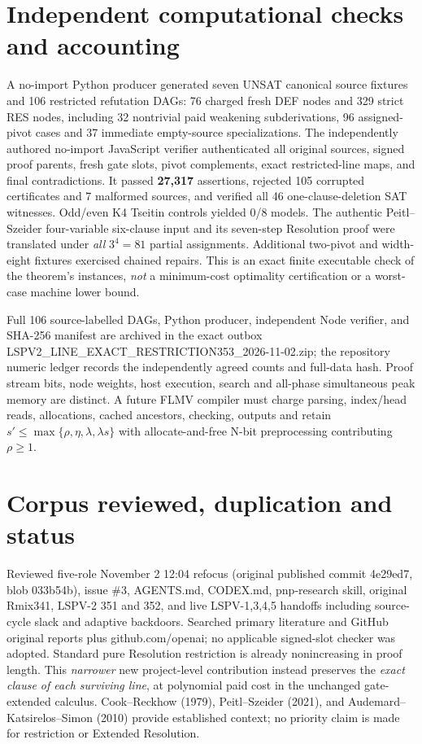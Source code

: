 \documentclass[11pt]{article}
\begin{document}
\section*{Independent computational checks and accounting}
A no-import Python producer generated seven UNSAT canonical source fixtures and 106 restricted refutation DAGs: 76 charged fresh DEF nodes and 329 strict RES nodes, including 32 nontrivial paid weakening subderivations, 96 assigned-pivot cases and 37 immediate empty-source specializations. The independently authored no-import JavaScript verifier authenticated all original sources, signed proof parents, fresh gate slots, pivot complements, exact restricted-line maps, and final contradictions. It passed \textbf{27,317} assertions, rejected 105 corrupted certificates and 7 malformed sources, and verified all 46 one-clause-deletion SAT witnesses. Odd/even K4 Tseitin controls yielded 0/8 models. The authentic Peitl--Szeider four-variable six-clause input and its seven-step Resolution proof were translated under \emph{all} $3^4=81$ partial assignments. Additional two-pivot and width-eight fixtures exercised chained repairs. This is an exact finite executable check of the theorem's instances, \emph{not} a minimum-cost optimality certification or a worst-case machine lower bound.

Full 106 source-labelled DAGs, Python producer, independent Node verifier, and SHA-256 manifest are archived in the exact outbox LSPV2\_LINE\_EXACT\_RESTRICTION353\_2026-11-02.zip; the repository numeric ledger records the independently agreed counts and full-data hash. Proof stream bits, node weights, host execution, search and all-phase simultaneous peak memory are distinct. A future FLMV compiler must charge parsing, index/head reads, allocations, cached ancestors, checking, outputs and retain $s'\le\max\{\rho,\eta,\lambda,\lambda s\}$ with allocate-and-free N-bit preprocessing contributing $\rho\ge1$.

\section*{Corpus reviewed, duplication and status}
Reviewed five-role November 2 12:04 refocus (original published commit 4e29ed7, blob 033b54b), issue \#3, AGENTS.md, CODEX.md, pnp-research skill, original Rmix341, LSPV-2 351 and 352, and live LSPV-1,3,4,5 handoffs including source-cycle slack and adaptive backdoors. Searched primary literature and GitHub original reports plus github.com/openai; no applicable signed-slot checker was adopted. Standard pure Resolution restriction is already nonincreasing in proof length. This \emph{narrower} new project-level contribution instead preserves the \emph{exact clause of each surviving line}, at polynomial paid cost in the unchanged gate-extended calculus. Cook--Reckhow (1979), Peitl--Szeider (2021), and Audemard--Katsirelos--Simon (2010) provide established context; no priority claim is made for restriction or Extended Resolution.
\end{document}
